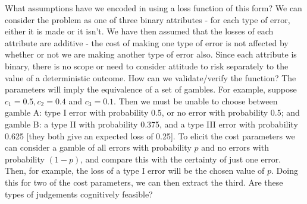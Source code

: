 \documentclass{article} %
\begin{document}
What assumptions have we encoded in using a loss function of this form? We can consider the problem as one of three binary attributes - for each type of error, either it is made or it isn't. We have then assumed that the losses of each attribute are additive - the cost of making one type of error is not affected by whether or not we are making another type of error also. Since each attribute is binary, there is no scope or need to consider attitude to risk separately to the value of a deterministic outcome. How can we validate/verify the function? The parameters will imply the equivalence of a set of gambles. For example, suppose $c_{1} = 0.5, c_{2} = 0.4$ and $c_{3} = 0.1$. Then we must be unable to choose between gamble A: type I error with probability 0.5, or no error with probability 0.5; and gamble B: a type II with probability 0.375, and a type III error with probability 0.625 [they both give an expected loss of 0.25]. To elicit the cost parameters we can consider a gamble of all errors with probability $p$ and no errors with probability $(1-p)$, and compare this with the certainty of just one error. Then, for example, the loss of a type I error will be the chosen value of $p$. Doing this for two of the cost parameters, we can then extract the third. Are these types of judgements cognitively feasible?
\end{document}

